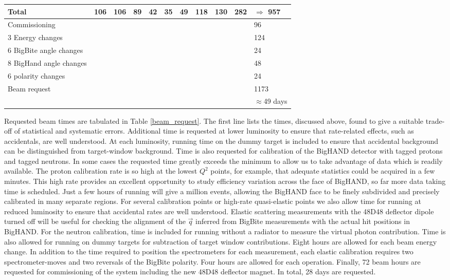 \documentclass[12pt,letterpaper,oneside]{article}
\begin{document}
\begin{table}
\begin{center}
{\begin{tabular}{|l|l|l|l|l|l|l|l|l|l|l|}
Total&
106&106&89&42&35&49&118&130&282&
$\Rightarrow$ 957\\
\hline
\hline
Commissioning&&&&&&&&&&96\\
\hline
3 Energy changes&&&&&&&&&&124\\
\hline
6 BigBite angle changes&&&&&&&&&&24\\
\hline
8 BigHand angle changes&&&&&&&&&&48\\
\hline
6 polarity changes&&&&&&&&&&24\\
\hline
\hline
Beam request&&&&&&&&&&1173\\
&&&&&&&&&&$\approx$49 days\\
\hline
\end{tabular}}
\end{center}
\end{table}

Requested beam times are tabulated in 
Table \ref{beam_request}. 
The first line lists the times, discussed above, found to give a
suitable trade-off of statistical and systematic errors.  Additional
time is requested at lower luminosity to ensure that rate-related
effects, such as accidentals, are well understood.  At each
luminosity, running time on the dummy target is included to ensure
that accidental background can be distinguished from target-window
background.
Time is also requested for calibration of the BigHAND detector with
tagged protons and tagged neutrons.
 In some cases the requested time greatly
exceeds the minimum to allow us to take advantage 
of data which is readily
available.  The proton calibration rate is so high at the lowest
$Q^2$ points, for example, that adequate statistics could be
acquired in a few minutes.  This high rate provides an excellent
opportunity to study efficiency variation across the face of BigHAND,
so far more data taking time is scheduled.  Just a few hours of running
will give a million events, allowing the BigHAND face to be finely
subdivided and precisely calibrated in many separate regions.  For several
calibration points or high-rate quasi-elastic points we also allow
time for running at reduced luminosity to ensure that accidental rates
are well understood. 
Elastic scattering measurements with the 48D48 deflector dipole turned
off will be useful for checking the alignment of the $\vec{q}$
inferred from BigBite measurements with the actual hit positions in BigHAND.
For the
neutron calibration, time is included for running without a radiator
to measure the virtual photon contribution. 
 Time is also allowed for running on dummy
targets for subtraction of target window contributions.  
 Eight hours are allowed for each beam energy change. 
In addition to the time required to position the spectrometers for
each measurement, each elastic calibration requires two
spectrometer-moves and two reversals of the BigBite polarity.  Four
hours are allowed for each operation.
Finally, 72 beam hours are requested for commissioning of the system
including the new 48D48 deflector magnet.  In total, 28 days are requested.
\end{document}

